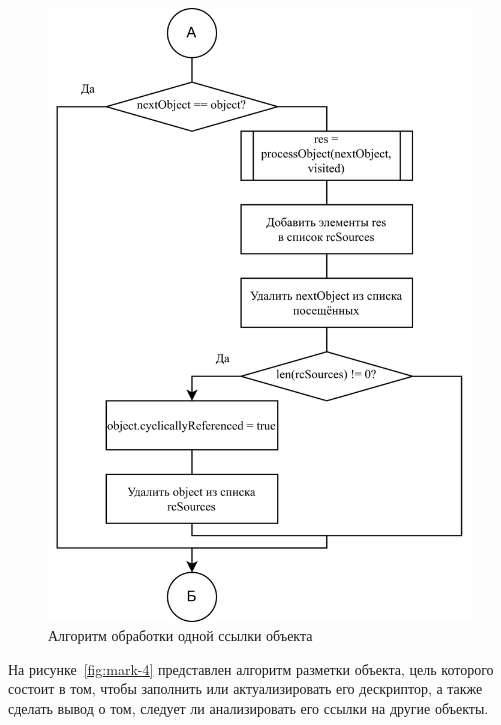 \begin{figure}[H]
	\centering
	\includegraphics[scale=0.185]{assets/mark-3.png}
	\caption{Алгоритм обработки одной ссылки объекта}
	\label{fig:mark-3}
\end{figure}

На рисунке~\ref{fig:mark-4} представлен алгоритм разметки объекта, цель которого состоит в том, чтобы заполнить или актуализировать его дескриптор, а также сделать вывод о том, следует ли анализировать его ссылки на другие объекты.

